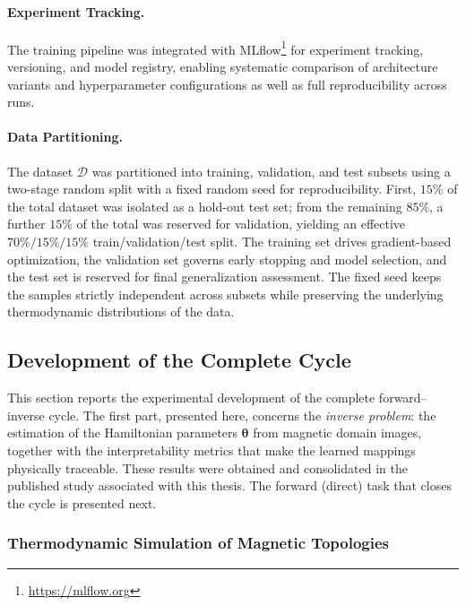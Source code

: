 \documentclass[letterpaper, 12, one column]{article}
\begin{document}
\paragraph{Experiment Tracking.}
The training pipeline was integrated with MLflow\footnote{\url{https://mlflow.org}} for experiment tracking, versioning, and model registry, enabling systematic comparison of architecture variants and hyperparameter configurations as well as full reproducibility across runs.

\paragraph{Data Partitioning.}
The dataset $\mathcal{D}$ was partitioned into training, validation, and test subsets using a two-stage random split with a fixed random seed for reproducibility. First, $15\%$ of the total dataset was isolated as a hold-out test set; from the remaining $85\%$, a further $15\%$ of the total was reserved for validation, yielding an effective $70\%/15\%/15\%$ train/validation/test split. The training set drives gradient-based optimization, the validation set governs early stopping and model selection, and the test set is reserved for final generalization assessment. The fixed seed keeps the samples strictly independent across subsets while preserving the underlying thermodynamic distributions of the data.

\subsection{Development of the Complete Cycle}\label{sec:cycle_development}

This section reports the experimental development of the complete forward--inverse cycle. The first part, presented here, concerns the \emph{inverse problem}: the estimation of the Hamiltonian parameters $\boldsymbol{\theta}$ from magnetic domain images, together with the interpretability metrics that make the learned mappings physically traceable. These results were obtained and consolidated in the published study associated with this thesis. The forward (direct) task that closes the cycle is presented next.

\subsubsection{Thermodynamic Simulation of Magnetic Topologies}
\label{sec:thermo_results}
\end{document}
